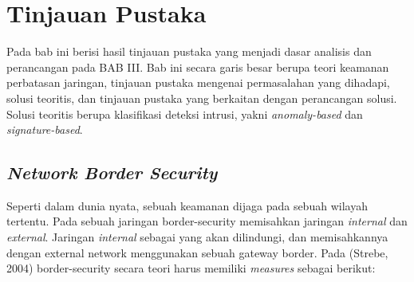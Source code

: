 \chapter{Tinjauan Pustaka}

Pada bab ini berisi hasil tinjauan pustaka yang menjadi dasar analisis dan perancangan pada BAB III. Bab ini secara garis besar berupa teori keamanan perbatasan jaringan, tinjauan pustaka mengenai permasalahan yang dihadapi, solusi teoritis, dan tinjauan pustaka yang berkaitan dengan perancangan solusi. Solusi teoritis berupa klasifikasi deteksi intrusi, yakni \textit{anomaly-based} dan \textit{signature-based}.

\section{\textit{Network Border Security}}

Seperti dalam dunia nyata, sebuah keamanan dijaga pada sebuah wilayah tertentu. Pada sebuah jaringan border-security memisahkan jaringan \textit{internal} dan \textit{external}. Jaringan \textit{internal} sebagai yang akan dilindungi, dan memisahkannya dengan external network menggunakan sebuah gateway border. Pada (Strebe, 2004) border-security secara teori harus memiliki \textit{measures} sebagai berikut:

